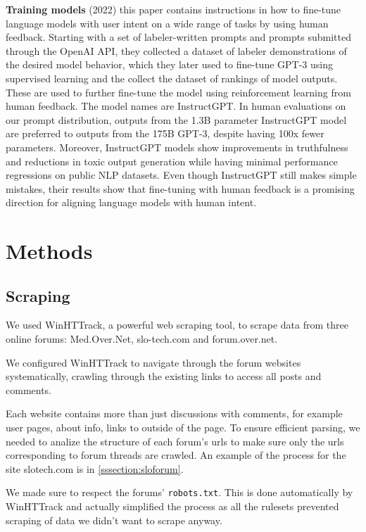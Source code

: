 \documentclass[fleqn,moreauthors,10pt]{ds_report}
\begin{document}
\noindent
\textbf{Training models} (2022) \cite{ouyang2022training} this paper contains instructions in how to fine-tune language models with user intent on a wide range of tasks by using human feedback.
Starting with a set of labeler-written prompts and prompts
submitted through the OpenAI API, they collected a dataset of labeler demonstrations
of the desired model behavior, which they later used to fine-tune GPT-3 using supervised
learning and the collect the dataset of rankings of model outputs. These are used to further fine-tune the model using reinforcement learning from human feedback. The model names are InstructGPT. In human evaluations on
our prompt distribution, outputs from the 1.3B parameter InstructGPT model are
preferred to outputs from the 175B GPT-3, despite having 100x fewer parameters.
Moreover, InstructGPT models show improvements in truthfulness and reductions
in toxic output generation while having minimal performance regressions on public
NLP datasets. Even though InstructGPT still makes simple mistakes, their results
show that fine-tuning with human feedback is a promising direction for aligning
language models with human intent.


\section*{Methods}

\subsection*{Scraping}

We used WinHTTrack, a powerful web scraping tool, to scrape data from three online forums: Med.Over.Net, slo-tech.com and forum.over.net.

We configured WinHTTrack to navigate through the forum websites systematically, crawling through the existing links to access all posts and comments.

Each website contains more than just discussions with comments, for example user pages, about info, links to outside of the page. To ensure efficient parsing, we needed to analize the structure of each forum's urls to make sure only the urls corresponding to forum threads are crawled. An example of the process for the site slotech.com is in \ref{sssection:sloforum}.

We made sure to respect the forums' \texttt{robots.txt}. This is done automatically by WinHTTrack and actually simplified the process as all the rulesets prevented scraping of data we didn't want to scrape anyway.
\end{document}
